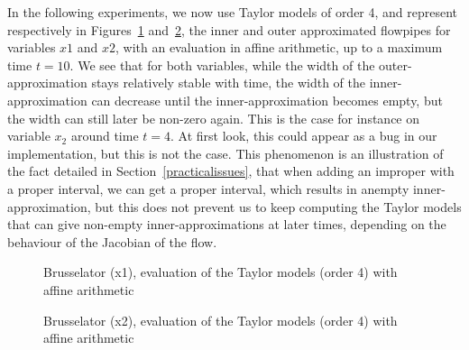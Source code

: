 In the following experiments, we now use Taylor models of order 4, and represent respectively in Figures~\ref{fig:brusselator_order4_x1_t10} and~\ref{fig:brusselator_order4_x2_t10}, the inner and outer approximated flowpipes for variables $x1$ and $x2$, with an evaluation in affine arithmetic, up to a maximum time $t=10$. We see that for both variables, while the width of the outer-approximation stays relatively stable with time, the width of the inner-approximation can decrease until the inner-approximation becomes empty, but the width can still later be non-zero again. This is the case for instance on variable $x_2$ around time $t=4$. At first look, this could appear as a bug in our implementation, but this is not the case. This phenomenon is an illustration of the fact detailed in Section~\ref{practicalissues}, that when adding an improper with a proper interval, we can get a proper interval, which results in anempty inner-approximation, but this does not prevent us to keep computing the Taylor models that can give non-empty inner-approximations at later times, depending on the behaviour of the Jacobian of the flow.    

\begin{figure}[htbp]
\begin{center}
\end{center}
\caption{Brusselator (x1), evaluation of the Taylor models (order 4) with affine arithmetic \label{fig:brusselator_order4_x1_t10}}
\end{figure}

\begin{figure}[htbp]
\begin{center}
\end{center}
\caption{Brusselator (x2), evaluation of the Taylor models (order 4) with affine arithmetic \label{fig:brusselator_order4_x2_t10}}
\end{figure}



